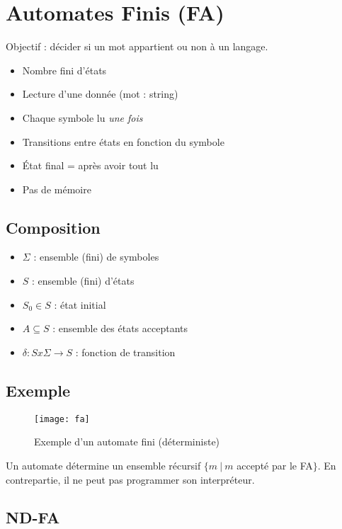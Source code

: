 \section{Automates Finis (FA)}

Objectif : décider si un mot appartient ou non à un langage.
\begin{itemize}
\item Nombre fini d'états
\item Lecture d'une donnée (mot : string)
\item Chaque symbole lu \textit{une fois}
\item Transitions entre états en fonction du symbole
\item État final = après avoir tout lu
\item Pas de mémoire
\end{itemize}

\subsection{Composition}

\begin{itemize}
\item $\Sigma$ : ensemble (fini) de symboles
\item $S$ : ensemble (fini) d'états
\item $S_0 \in S$ : état initial
\item $A \subseteq S$ : ensemble des états acceptants
\item $\delta : Sx\Sigma \rightarrow S$ : fonction de transition
\end{itemize}

\subsection{Exemple}

\begin{figure}[H]
    \centering
    \texttt{[image: fa]}
    \caption{Exemple d'un automate fini (déterministe)}
\end{figure}

Un automate détermine un ensemble récursif $\{m\ |\ m$ accepté par le FA$\}$. En contrepartie, il ne peut pas programmer son interpréteur.

\subsection{ND-FA}

